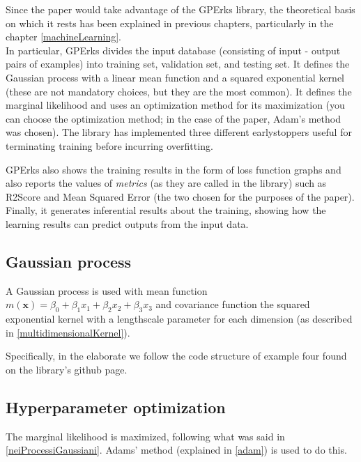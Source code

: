 Since the paper would take advantage of the GPErks library, the theoretical basis on which it rests has been explained in previous chapters, particularly in the chapter \ref{machineLearning}.\\

In particular, GPErks divides the input database (consisting of input - output pairs of examples) into training set, validation set, and testing set. It defines the Gaussian process with a linear mean function and a squared exponential kernel (these are not mandatory choices, but they are the most common). It defines the marginal likelihood and uses an optimization method for its maximization (you can choose the optimization method; in the case of the paper, Adam's method was chosen). The library has implemented three different earlystoppers useful for terminating training before incurring overfitting. 

GPErks also shows the training results in the form of loss function graphs and also reports the values of \textit{metrics} (as they are called in the library) such as R2Score and Mean Squared Error (the two chosen for the purposes of the paper). Finally, it generates inferential results about the training, showing how the learning results can predict outputs from the input data.

\subsection{Gaussian process}
A Gaussian process is used with mean function $m(\mathbf{x})=\beta_0+\beta_1x_1+\beta_2x_2+\beta_3x_3$ and covariance function the squared exponential kernel with a lengthscale parameter for each dimension (as described in \ref{multidimensionalKernel}).

Specifically, in the elaborate we follow the code structure of example four found on the library's github page. 

\subsection{Hyperparameter optimization}
The marginal likelihood is maximized, following what was said in \ref{neiProcessiGaussiani}. Adams' method (explained in \ref{adam}) is used to do this.


